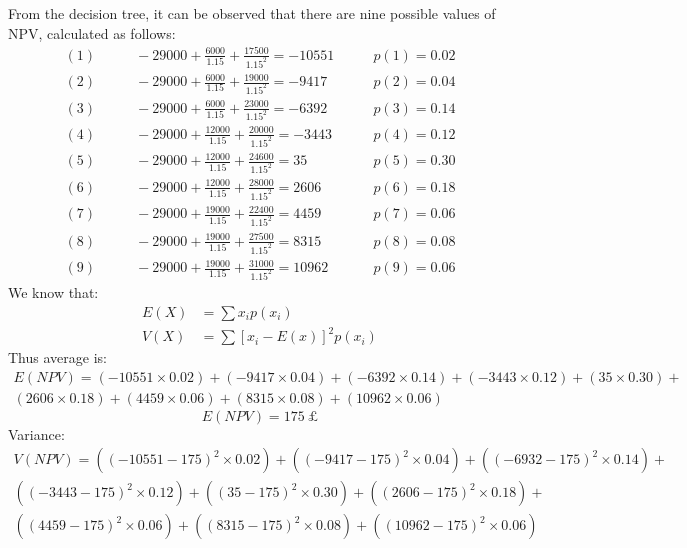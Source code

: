 From the decision tree, it can be observed that there are nine possible values of NPV, calculated as follows:
\begin{align}
    (1) & \qquad -29000 + \frac{6000}{1.15} + \frac{17500}{1.15^2} = -10551 \qquad & p(1) = 0.02 \\
    (2) & \qquad -29000 + \frac{6000}{1.15} + \frac{19000}{1.15^2} = -9417 \qquad  & p(2) = 0.04 \\
    (3) & \qquad -29000 + \frac{6000}{1.15} + \frac{23000}{1.15^2} = -6392 \qquad  & p(3) = 0.14 \\
    (4) & \qquad -29000 + \frac{12000}{1.15} + \frac{20000}{1.15^2} = -3443 \qquad & p(4) = 0.12 \\
    (5) & \qquad -29000 + \frac{12000}{1.15} + \frac{24600}{1.15^2} = 35 \qquad    & p(5) = 0.30 \\
    (6) & \qquad -29000 + \frac{12000}{1.15} + \frac{28000}{1.15^2} = 2606 \qquad  & p(6) = 0.18 \\
    (7) & \qquad -29000 + \frac{19000}{1.15} + \frac{22400}{1.15^2} = 4459 \qquad  & p(7) = 0.06 \\
    (8) & \qquad -29000 + \frac{19000}{1.15} + \frac{27500}{1.15^2} = 8315 \qquad  & p(8) = 0.08 \\
    (9) & \qquad -29000 + \frac{19000}{1.15} + \frac{31000}{1.15^2} = 10962 \qquad & p(9) = 0.06
\end{align}
We know that:
\begin{align}
    E\left(X\right) & = \sum x_i p\left(x_i\right)                                  \\
    V\left(X\right) & = \sum \left[x_i - E\left(x\right)\right]^2 p\left(x_i\right)
\end{align}
Thus average is:
\begin{multline}
    E\left(NPV\right) = \left(-10551 \times 0.02\right) + \left(-9417 \times 0.04\right) + \left(-6392 \times 0.14\right) + \left(-3443 \times 0.12\right) + \left(35 \times 0.30\right) + \\ \left(2606 \times 0.18\right) + \left(4459 \times 0.06\right) + \left(8315 \times 0.08\right) + \left(10962 \times 0.06\right)
\end{multline}
\begin{equation}
    E\left(NPV\right) = \SI{175}{\pounds}
\end{equation}
Variance:
\begin{multline}
    V\left(NPV\right) = \left(\left(-10551 -175\right)^2\times 0.02 \right) +
    \left(\left(-9417 -175\right)^2\times 0.04 \right) +
    \left(\left(-6932 -175\right)^2\times 0.14 \right) +\\
    \left(\left(-3443 -175\right)^2\times 0.12 \right) +
    \left(\left(35 -175\right)^2\times 0.30 \right) +
    \left(\left(2606 -175\right)^2\times 0.18 \right) + \\
    \left(\left(4459 -175\right)^2\times 0.06 \right) +
    \left(\left(8315 -175\right)^2\times 0.08 \right) +
    \left(\left(10962 -175\right)^2\times 0.06 \right)
\end{multline}
